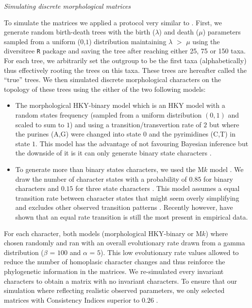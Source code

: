 \documentclass[12pt,letterpaper]{article}
\renewcommand{\subsection}[1]{%
\bigskip
\begin{center}
\begin{large}
\normalfont\itshape #1
\end{large}
\end{center}}
\begin{document}
\subsection{Simulating discrete morphological matrices}
To simulate the matrices we applied a protocol very similar to \citep{Guillerme2016146}.
First, we generate random birth-death trees with the birth ($\lambda$) and death ($\mu$) parameters sampled from a uniform ($0$,$1$) distribution maintaining $\lambda$ $>$ $\mu$ using the diversitree \texttt{R} package \citep[v0.9-8;][]{fitzjohndiversitree2012} and saving the tree after reaching either 25, 75 or 150 taxa.
For each tree, we arbitrarily set the outgroup to be the first taxa (alphabetically) thus effectively rooting the trees on this taxa.
These trees are hereafter called the ``true'' trees.
We then simulated discrete morphological characters on the topology of these trees using the either of the two following models:
\begin{itemize}
    \item The morphological HKY-binary model \citep{OReilly20160081} which is an HKY model \citep{HKY85} with a random states frequency (sampled from a uniform distribution $(0,1)$ and scaled to sum to $1$) and using a transition/transvertion rate of $2$ \citep{douadycomparison2003} but where the purines (A,G) were changed into state $0$ and the pyrimidines (C,T) in state $1$.
    This model has the advantage of not favouring Bayesian inference \citep[since it doesn't use a M$k$ model;][; see below]{OReilly20160081} but the downside of it is it can only generate binary state characters \citep[or 4 states;][]{puttick2017uncertain}.
    \item To generate more than binary states characters, we used the M$k$ model \citep{lewisa2001}.
    We draw the number of character states with a probability of $0.85$ for binary characters and $0.15$ for three state characters \citep{Guillerme2016146}.
    This model assumes a equal transition rate between character states that might seem overly simplifying and excludes other observed transition patterns \citep[e.g. Dollo characters;][]{Dollo,wright2015came}.
    Recently however, \cite{Wright01072016} have shown that an equal rate transition is still the most present in empirical data.
\end{itemize}

\noindent For each character, both models (morphological HKY-binary or M$k$) where chosen randomly and ran with an overall evolutionary rate drawn from a gamma distribution ($\beta$ = $100$ and $\alpha$ = $5$).
This low evolutionary rate values allowed to reduce the number of homoplasic character changes and thus reinforce the phylogenetic information in the matrices.
We re-simulated every invariant characters to obtain a matrix with no invariant characters.
To ensure that our simulation where reflecting realistic observed parameters, we only selected matrices with Consistency Indices superior to $0.26$ \citep{OReilly20160081}.
\end{document}

